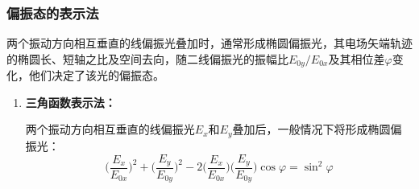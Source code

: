 \documentclass[cn,10pt,chinesefont=founder,math=mtpro2,cite=super,toc=onecol,twoside,openany]{elegantbook}
\begin{document}
\subsubsection{偏振态的表示法}
两个振动方向相互垂直的线偏振光叠加时，通常形成椭圆偏振光，其电场矢端轨迹的椭圆长、短轴之比及空间去向，随二线偏振光的振幅比$E_{0y}/E_{0x}$及其相位差$\varphi$变化，他们决定了该光的偏振态。
\begin{enumerate}
	\item \textbf{三角函数表示法：}

	两个振动方向相互垂直的线偏振光$E_x$和$E_y$叠加后，一般情况下将形成椭圆偏振光：
	\begin{equation}
	\bigg(\frac{E_x}{E_{0x}}\bigg)^2+\bigg(\frac{E_y}{E_{0y}}\bigg)^2-2\bigg(\frac{E_x}{E_{0x}}\bigg)\bigg(\frac{E_y}{E_{0y}}\bigg)\cos\varphi=\sin^2\varphi
	\end{equation}
\end{enumerate}
\end{document}
